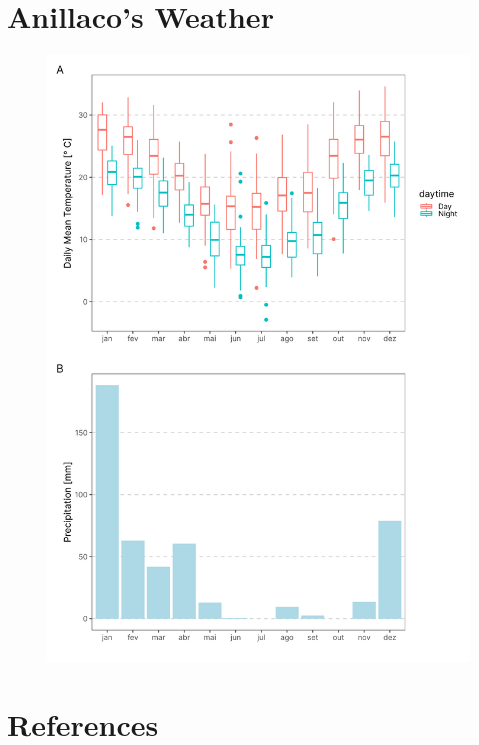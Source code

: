\documentclass[msc,numbers,hidelinks]{coppe}
\begin{document}
  \hypertarget{anillacos-weather}{%
  \chapter{Anillaco's Weather}\label{anillacos-weather}}
  \begin{figure}
  \includegraphics[width=1\linewidth]{../05_figures/weather/weather} \end{figure}

  \backmatter
  
  

  \hypertarget{references}{%
  \chapter*{References}\label{references}}
\end{document}
